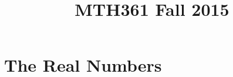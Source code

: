 \documentclass[12pt]{amsbook}
\theoremstyle{plain}
\numberwithin{section}{chapter}
\begin{document}
\title{MTH361 Fall 2015}
\maketitle
{}
\setcounter{tocdepth}{4} 
\tableofcontents
\mainmatter 
\chapter{The Real Numbers}

\end{document}
